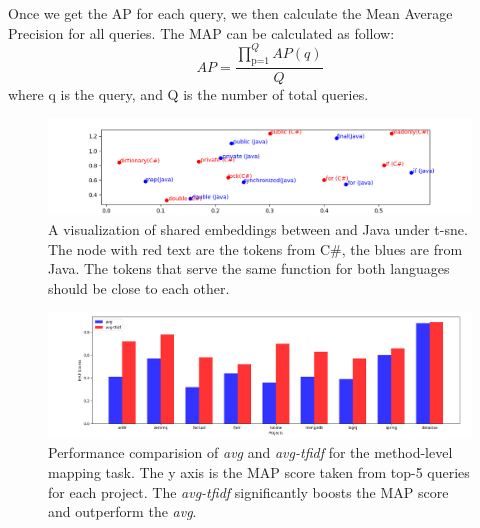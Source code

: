 Once we get the AP for each query, we then calculate the Mean Average Precision for all queries. The MAP can be calculated as follow:
\begin{displaymath}
AP = \frac{\prod_\text{p=1}^Q AP(q)}{Q}
\end{displaymath}
where q is the query, and Q is the number of total queries.
\begin{figure}[t!]
	\centering
	\includegraphics[width=1\textwidth]{example_bi2vec_tsne}
	\caption{A visualization of shared embeddings between  and Java under t-sne. The node with red text are the tokens from C\#, the blues are from Java. The tokens that serve the same function for both languages should be close to each other.}
	\label{fig:tsne}
\end{figure}

\begin{figure}[t!]
	\centering
	
	\includegraphics[width=1.05\textwidth]{avg_vs_tfidf}
	\caption{Performance comparision of \textit{avg} and \textit{avg-tfidf} for the method-level mapping task. The y axis is the MAP score taken from top-5 queries for each project. The \textit{avg-tfidf} significantly boosts the MAP score and outperform the \textit{avg}.}
	\label{fig:avg_vs_tfidf}
\end{figure}



